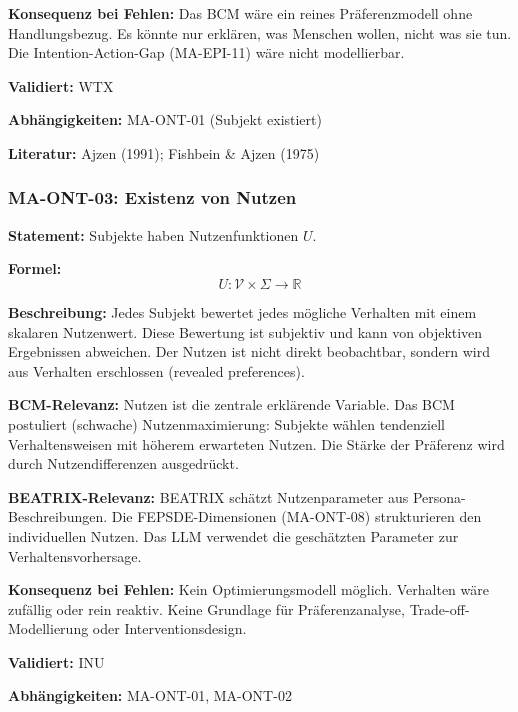 \textbf{Konsequenz bei Fehlen:}
Das BCM wäre ein reines Präferenzmodell ohne Handlungsbezug. Es könnte nur erklären, was Menschen wollen, nicht was sie tun. Die Intention-Action-Gap (MA-EPI-11) wäre nicht modellierbar.

\textbf{Validiert:} WTX

\textbf{Abhängigkeiten:} MA-ONT-01 (Subjekt existiert)

\textbf{Literatur:} Ajzen (1991); Fishbein \& Ajzen (1975)


\subsubsection*{MA-ONT-03: Existenz von Nutzen}

\textbf{Statement:} Subjekte haben Nutzenfunktionen $U$.

\textbf{Formel:}
\begin{equation}
U: \mathcal{V} \times \Sigma \rightarrow \mathbb{R}
\end{equation}

\textbf{Beschreibung:}
Jedes Subjekt bewertet jedes mögliche Verhalten mit einem skalaren Nutzenwert. Diese Bewertung ist subjektiv und kann von objektiven Ergebnissen abweichen. Der Nutzen ist nicht direkt beobachtbar, sondern wird aus Verhalten erschlossen (revealed preferences).

\textbf{BCM-Relevanz:}
Nutzen ist die zentrale erklärende Variable. Das BCM postuliert (schwache) Nutzenmaximierung: Subjekte wählen tendenziell Verhaltensweisen mit höherem erwarteten Nutzen. Die Stärke der Präferenz wird durch Nutzendifferenzen ausgedrückt.

\textbf{BEATRIX-Relevanz:}
BEATRIX schätzt Nutzenparameter aus Persona-Beschreibungen. Die FEPSDE-Dimensionen (MA-ONT-08) strukturieren den individuellen Nutzen. Das LLM verwendet die geschätzten Parameter zur Verhaltensvorhersage.

\textbf{Konsequenz bei Fehlen:}
Kein Optimierungsmodell möglich. Verhalten wäre zufällig oder rein reaktiv. Keine Grundlage für Präferenzanalyse, Trade-off-Modellierung oder Interventionsdesign.

\textbf{Validiert:} INU

\textbf{Abhängigkeiten:} MA-ONT-01, MA-ONT-02

